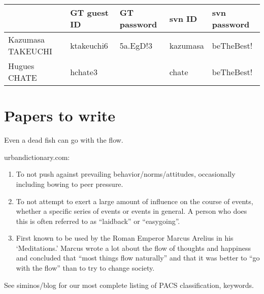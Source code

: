 \begin{tabular}{l|ll|ll} %
                    & GT guest ID &GT password& svn ID   & svn password \\  \hline
  Kazumasa TAKEUCHI & ktakeuchi6  & 5a.EgD!3  & kazumasa & beTheBest! \\
  Hugues   CHATE    & hchate3     &           & chate    & beTheBest! \\
\end{tabular}

\section{Papers to write}

\begin{bartlett}{
Even a dead fish can go with the flow.}
\end{bartlett}


{urbandictionary.com}:

\begin{enumerate}
   \item To not push against prevailing behavior/norms/attitudes,
   occasionally including bowing to peer pressure.

   \item To not attempt to exert a large amount of influence on the
   course of events, whether a specific series of events or events in
   general. A person who does this is often referred to as ``laidback''
   or ``easygoing''.

   \item First known to be used by the Roman Emperor Marcus Arelius in
   his `Meditations.' Marcus wrote a lot about the flow of
   thoughts and happiness and concluded that ``most things flow
   naturally'' and that it was better to ``go with the flow''
   than to try to change society.
 \end{enumerate}

See siminos/blog for our most complete listing of
PACS classification, keywords.

